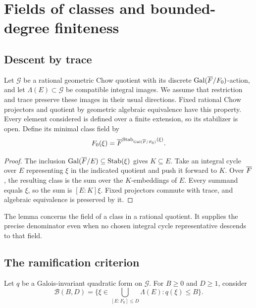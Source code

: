 \section{Fields of classes and bounded-degree finiteness}\label{sec:fields}

\subsection{Descent by trace}\label{sec:class-fields}

Let \(\mathcal G\) be a rational geometric Chow quotient with its
discrete \(\operatorname{Gal}(\overline F/F_0)\)-action, and let \(\Lambda(E)\subset\mathcal G\)
be compatible integral images. We assume that restriction and trace
preserve these images in their usual directions. Fixed rational Chow
projectors and quotient by geometric algebraic equivalence have this
property. Every element considered is defined over a finite extension,
so its stabilizer is open. Define its minimal class field by
\[
 F_0(\xi)=\overline F^{\operatorname{Stab}_{\operatorname{Gal}(\overline F/F_0)}(\xi)}.
\]


\begin{proof}
The inclusion \(\operatorname{Gal}(\overline F/E)\subseteq\operatorname{Stab}(\xi)\) gives
\(K\subseteq E\). Take an integral cycle over \(E\) representing
\(\xi\) in the indicated quotient and push it forward to \(K\).
Over \(\overline F\), the resulting class is the sum over the
\(K\)-embeddings of \(E\). Every summand equals \(\xi\), so
the sum is \([E:K]\xi\). Fixed projectors commute with trace,
and algebraic equivalence is preserved by it.
\end{proof}

The lemma concerns the field of a class in a rational quotient.
It supplies the precise denominator even when no chosen integral
cycle representative descends to that field.

\subsection{The ramification criterion}\label{sec:ramification-proof}

Let \(q\) be a Galois-invariant quadratic form on \(\mathcal G\).
For \(B\ge0\) and \(D\ge1\), consider
\[
 \mathcal B(B,D)=
 \{\xi\in\bigcup_{[E:F_0]\le D}\Lambda(E):q(\xi)\le B\}.
\]

